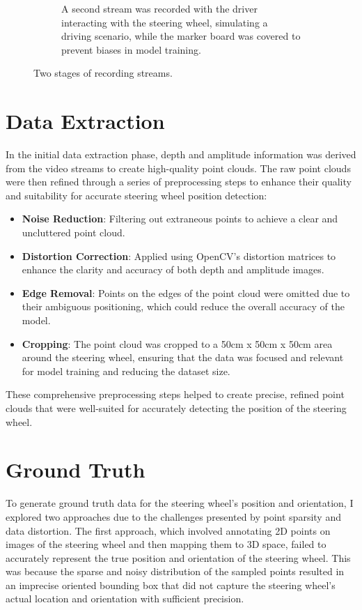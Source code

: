 \begin{figure}[ht]
\begin{subfigure}[t]{0.45\textwidth}
        \caption{A second stream was recorded with the driver 
        interacting with the steering wheel, simulating a 
        driving scenario, while the marker board was covered 
        to prevent biases in model training.}
        \label{fig:main_stream}
    \end{subfigure}
    \caption{Two stages of recording streams.}
\end{figure}

\section{Data Extraction}
In the initial data extraction phase, depth and amplitude 
information was derived from the video streams to create 
high-quality point clouds. The raw point clouds were then refined 
through a series of preprocessing steps to enhance their quality 
and suitability for accurate steering wheel position detection:

\begin{itemize}
    \item \textbf{Noise Reduction}: Filtering out extraneous points to 
    achieve a clear and uncluttered point cloud.
    \item \textbf{Distortion Correction}: Applied using 
    OpenCV's distortion matrices to enhance the clarity and accuracy 
    of both depth and amplitude images.
    \item \textbf{Edge Removal}: Points on the edges of the point cloud 
    were omitted due to their ambiguous positioning, which could 
    reduce the overall accuracy of the model.
    \item \textbf{Cropping}: The point cloud was cropped to a 
    50cm x 50cm x 50cm area around the steering wheel, ensuring that 
    the data was focused and relevant for model training and reducing 
    the dataset size.
\end{itemize}

These comprehensive preprocessing steps helped to create precise, 
refined point clouds that were well-suited for accurately detecting 
the position of the steering wheel.


\section{Ground Truth}
To generate ground truth data for the steering wheel's position and 
orientation, I explored two approaches due to the challenges presented 
by point sparsity and data distortion. The first approach, which 
involved annotating 2D points on images of the steering wheel and then 
mapping them to 3D space, failed to accurately represent the true 
position and orientation of the steering wheel. This was because the 
sparse and noisy distribution of the sampled points resulted in an 
imprecise oriented bounding box that did not capture the steering 
wheel's actual location and orientation with sufficient precision. 

